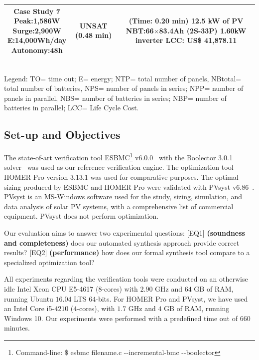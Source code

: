 \documentclass[journal]{IEEEtran}
\begin{document}
\begin{table}
\begin{scriptsize}
\begin{tabular}{c|c|c}
\hline
\makecell{\textbf{Case Study 7}\\Peak:1,586W\\Surge:2,900W\\E:14,000Wh/day\\Autonomy:48h} & UNSAT (0.48 min) & \makecell{(Time: 0.20 min)\\12.5 kW of PV\\NBT:66$\times$83.4Ah (2S-33P)\\1.60kW inverter\\LCC: US\$ 41,878.11} \\
\hline
\hline
\end{tabular}
\\Legend: TO= time out; E= energy; NTP= total number of panels, NBtotal= total number of batteries, NPS= number of panels in series; NPP= number of panels in parallel, NBS= number of batteries in series; NBP= number of batteries in parallel; LCC= Life Cycle Cost.
\end{scriptsize}
\end{table}

\subsection{Set-up and Objectives} 

The state-of-art verification tool ESBMC\footnote{Command-line: \$ esbmc filename.c -\phantom{}-incremental-bmc -\phantom{}-boolector} v6.0.0~\cite{esbmc2018} with the Boolector 3.0.1 solver~\cite{Brummayer} was used as our reference verification engine. The optimization tool HOMER Pro version $3.13.1$ was used for comparative purposes. The optimal sizing produced by ESBMC and HOMER Pro were validated with PVsyst v$6.86$~\cite{PVsyst}. PVsyst is an MS-Windows software used for the study, sizing, simulation, and data analysis of solar PV systems, with a comprehensive list of commercial equipment. PVsyst does not perform optimization. %

Our evaluation aims to answer two experimental questions: [EQ1] \textbf{(soundness and completeness)} does our automated synthesis approach provide correct results? [EQ2] \textbf{(performance)} how does our formal synthesis tool compare to a specialized optimization tool?

All experiments regarding the verification tools were conducted on an otherwise idle Intel Xeon CPU E5-4617 ($8$-cores) with $2.90$ GHz and $64$ GB of RAM, running Ubuntu $16.04$ LTS $64$-bits. For HOMER Pro and PVsyst, we have used an Intel Core i5-$4210$ ($4$-cores), with $1.7$ GHz and $4$ GB of RAM, running Windows 10. Our experiments were performed with a predefined time out of $660$ minutes.
\end{document}
